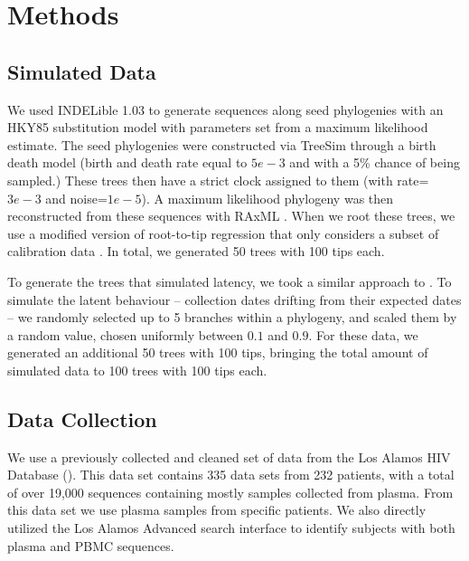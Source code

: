 \section{Methods} \label{sec:methods}
\subsection{Simulated Data} \label{subsec:simdata}
We used INDELible 1.03 \citep{Indelible09} to generate sequences along seed phylogenies with an HKY85 \citep{HKY85} substitution model with parameters set from a maximum likelihood estimate. The seed phylogenies were constructed via TreeSim \citep{TreeSim, Stradler13, Boskova14} through a birth death model (birth and death rate equal to $5e-3$ and with a 5\% chance of being sampled.) These trees then have a strict clock assigned to them (with rate=$3e-3$ and noise=$1e-5$). A maximum likelihood phylogeny was then reconstructed from these sequences with RAxML \citep{Raxml14}. When we root these trees, we use a modified version of root-to-tip regression that only considers a subset of calibration data \citep{APE}. In total, we generated 50 trees with 100 tips each. 

To generate the trees that simulated latency, we took a similar approach to \cite{Immonen14}. To simulate the latent behaviour -- collection dates drifting from their expected dates -- we randomly selected up to 5 branches within a phylogeny, and scaled them by a random value, chosen uniformly between $0.1$ and $0.9$. For these data, we generated an additional 50 trees with 100 tips, bringing the total amount of simulated data to 100 trees with 100 tips each. 

\subsection{Data Collection} \label{subsec:dcollection}
We use a previously collected and cleaned set of data \citep{McCloskey14} from the Los Alamos HIV Database (). This data set contains 335 data sets from 232 patients, with a total of over 19,000 sequences \citep{McCloskey14} containing mostly samples collected from plasma. From this data set we use  plasma samples from  specific patients. We also directly utilized the Los Alamos Advanced search interface \citep{LosAlamos} to identify subjects with both plasma and PBMC sequences.

